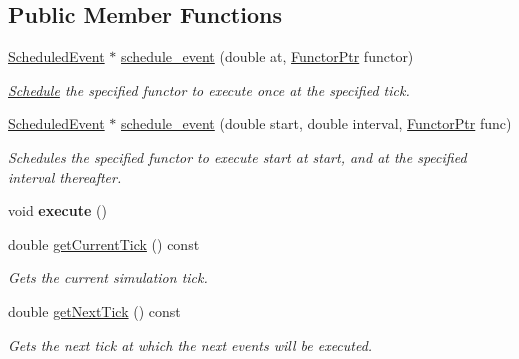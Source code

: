 \subsection*{Public Member Functions}
\begin{DoxyCompactItemize}
\item 
\hyperlink{classrepast_1_1_scheduled_event}{Scheduled\-Event} $\ast$ \hyperlink{classrepast_1_1_schedule_ac5084614d3511d6fae1ccb998be2453f}{schedule\-\_\-event} (double at, \hyperlink{classrepast_1_1_schedule_a6a31b68f08a9bb28381ffe02b18f1df3}{Functor\-Ptr} functor)
\begin{DoxyCompactList}\small\item\em \hyperlink{classrepast_1_1_schedule}{Schedule} the specified functor to execute once at the specified tick. \end{DoxyCompactList}\item 
\hyperlink{classrepast_1_1_scheduled_event}{Scheduled\-Event} $\ast$ \hyperlink{classrepast_1_1_schedule_a31305c3673b85cfa1e7cb3cc5e33acfc}{schedule\-\_\-event} (double start, double interval, \hyperlink{classrepast_1_1_schedule_a6a31b68f08a9bb28381ffe02b18f1df3}{Functor\-Ptr} func)
\begin{DoxyCompactList}\small\item\em Schedules the specified functor to execute start at start, and at the specified interval thereafter. \end{DoxyCompactList}\item 
\hypertarget{classrepast_1_1_schedule_ab055ccbdc3f4d9bb7602704b017f9363}{void {\bfseries execute} ()}\label{classrepast_1_1_schedule_ab055ccbdc3f4d9bb7602704b017f9363}

\item 
double \hyperlink{classrepast_1_1_schedule_a04f76630d4435283b94ee526f4de752b}{get\-Current\-Tick} () const 
\begin{DoxyCompactList}\small\item\em Gets the current simulation tick. \end{DoxyCompactList}\item 
double \hyperlink{classrepast_1_1_schedule_a02063913da3dac3a2f1b71d6dde05bea}{get\-Next\-Tick} () const 
\begin{DoxyCompactList}\small\item\em Gets the next tick at which the next events will be executed. \end{DoxyCompactList}\end{DoxyCompactItemize}


